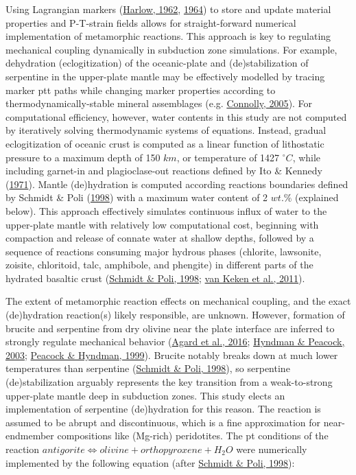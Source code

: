 Using Lagrangian markers (\protect\hyperlink{ref-harlow1962}{Harlow, 1962}, \protect\hyperlink{ref-harlow1964}{1964}) to store and update material properties and P-T-strain fields allows for straight-forward numerical implementation of metamorphic reactions. This approach is key to regulating mechanical coupling dynamically in subduction zone simulations. For example, dehydration (eclogitization) of the oceanic-plate and (de)stabilization of serpentine in the upper-plate mantle may be effectively modelled by tracing marker \gls{ptt} paths while changing marker properties according to thermodynamically-stable mineral assemblages (e.g. \protect\hyperlink{ref-connolly2005}{Connolly, 2005}). For computational efficiency, however, water contents in this study are not computed by iteratively solving thermodynamic systems of equations. Instead, gradual eclogitization of oceanic crust is computed as a linear function of lithostatic pressure to a maximum depth of 150 \(km\), or temperature of 1427 \(^\circ C\), while including garnet-in and plagioclase-out reactions defined by Ito \& Kennedy (\protect\hyperlink{ref-ito1971}{1971}). Mantle (de)hydration is computed according reactions boundaries defined by Schmidt \& Poli (\protect\hyperlink{ref-schmidt1998}{1998}) with a maximum water content of 2 \(wt.\%\) (explained below). This approach effectively simulates continuous influx of water to the upper-plate mantle with relatively low computational cost, beginning with compaction and release of connate water at shallow depths, followed by a sequence of reactions consuming major hydrous phases (chlorite, lawsonite, zoisite, chloritoid, talc, amphibole, and phengite) in different parts of the hydrated basaltic crust (\protect\hyperlink{ref-schmidt1998}{Schmidt \& Poli, 1998}; \protect\hyperlink{ref-vankeken2011}{van Keken et al., 2011}).

The extent of metamorphic reaction effects on mechanical coupling, and the exact (de)hydration reaction(s) likely responsible, are unknown. However, formation of brucite and serpentine from dry olivine near the plate interface are inferred to strongly regulate mechanical behavior (\protect\hyperlink{ref-agard2016}{Agard et al., 2016}; \protect\hyperlink{ref-hyndman2003}{Hyndman \& Peacock, 2003}; \protect\hyperlink{ref-peacock1999a}{Peacock \& Hyndman, 1999}). Brucite notably breaks down at much lower temperatures than serpentine (\protect\hyperlink{ref-schmidt1998}{Schmidt \& Poli, 1998}), so serpentine (de)stabilization arguably represents the key transition from a weak-to-strong upper-plate mantle deep in subduction zones. This study elects an implementation of serpentine (de)hydration for this reason. The reaction is assumed to be abrupt and discontinuous, which is a fine approximation for near-endmember compositions like (Mg-rich) peridotites. The \gls{pt} conditions of the reaction \(antigorite \Leftrightarrow olivine + orthopyroxene + H_{2}O\) were numerically implemented by the following equation (after \protect\hyperlink{ref-schmidt1998}{Schmidt \& Poli, 1998}):

